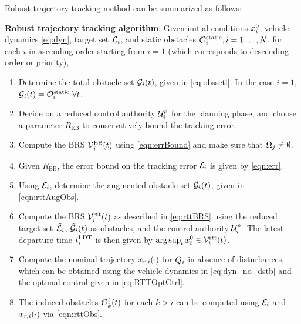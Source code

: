 Robust trajectory tracking method can be summarized as follows:
\begin{alg}
\label{alg:rtt}
\textbf{Robust trajectory tracking algorithm}: Given initial conditions $x_i^0$, vehicle dynamics \eqref{eq:dyn}, target set $\mathcal{L}_i$, and static obstacles $\mathcal{O}^\text{static}_i, i = 1\ldots, N$, for each $i$ in ascending order starting from $i=1$ (which corresponds to descending order or priority),
\begin{enumerate}
\item Determine the total obstacle set $\mathcal{G}_i(t)$, given in \eqref{eq:obsseti}. In the case $i=1$, $\mathcal{G}_i(t) = \mathcal{O}^\text{static}_i ~ \forall t$.
\item Decide on a reduced control authority $\mathcal{U}^p_i$ for the planning phase, and choose a parameter $R_{\text{EB}}$ to conservatively bound the tracking error. 
\item Compute the BRS $\mathcal{V}^{\text{EB}}_{j}(t)$ using \eqref{eqn:errBound} and make sure that $\Omega_j \neq \emptyset$. 
\item Given $R_{\text{EB}}$, the error bound on the tracking error $\mathcal{E}_i$ is given by \eqref{eqn:err}. 
\item Using $\mathcal{E}_i$, determine the augmented obstacle set $\tilde{\mathcal{G}}_i(t)$, given in \eqref{eqn:rttAugObs}. 
\item Compute the BRS $\mathcal{V}_i^\text{rtt}(t)$ as described in \eqref{eq:rttBRS} using the reduced target set $\tilde{\mathcal{L}}_i$, $\tilde{\mathcal{G}}_i(t)$ as obstacles, and the control authority $\mathcal{U}^p_i$. The latest departure time $t^\text{LDT}_i$ is then given by $\arg \sup_t x^0_i \in \mathcal{V}_i^\text{rtt}(t)$.
\item Compute the nominal trajectory $x_{r,i}(\cdot)$ for $Q_i$ in absence of disturbances, which can be obtained using the vehicle dynamics in \eqref{eq:dyn_no_dstb} and the optimal control given in \eqref{eq:RTTOptCtrl}.
\item The induced obstacles $\mathcal{O}_k^i(t)$ for each $k>i$ can be computed using $\mathcal{E}_i$ and $x_{r,i}(\cdot)$ via \eqref{eqn:rttObs}. 
\end{enumerate}
\end{alg}


